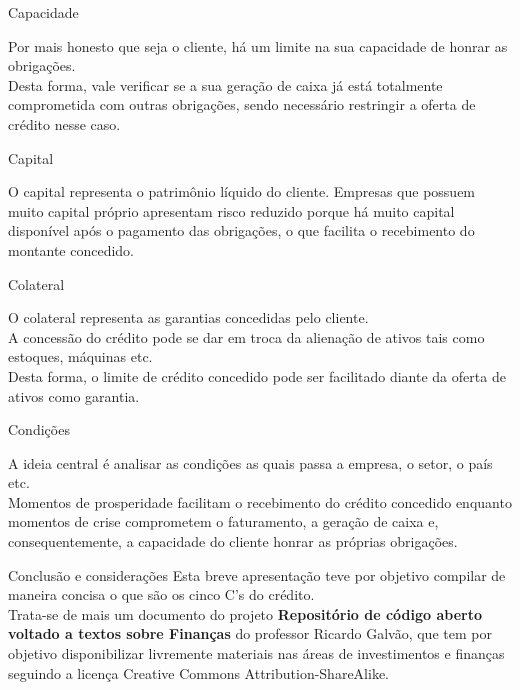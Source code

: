 \documentclass[10pt]{beamer}
\begin{document}
\begin{frame}[fragile]{Capacidade}

Por mais honesto que seja o cliente, há um limite na sua capacidade de honrar as obrigações.\\ Desta forma, vale verificar se a sua geração de caixa já está totalmente comprometida com outras obrigações, sendo necessário restringir a oferta de crédito nesse caso.

\end{frame}


\begin{frame}[fragile]{Capital}

O capital representa o patrimônio líquido do cliente. Empresas que possuem muito capital próprio apresentam risco reduzido porque há muito capital disponível após o pagamento das obrigações, o que facilita o recebimento do montante concedido.

\end{frame}

\begin{frame}[fragile]{Colateral}

O colateral representa as garantias concedidas pelo cliente. \\
A concessão do crédito pode se dar em troca da alienação de ativos tais como estoques, máquinas etc.\\
Desta forma, o limite de crédito concedido pode ser facilitado diante da oferta de ativos como garantia.

\end{frame}

\begin{frame}[fragile]{Condições}

A ideia central é analisar as condições as quais passa a empresa, o setor, o país etc.\\
Momentos de prosperidade facilitam o recebimento do crédito concedido enquanto momentos de crise comprometem o faturamento, a geração de caixa e, consequentemente, a capacidade do cliente honrar as próprias obrigações.

\end{frame}


\begin{frame}[fragile]{Conclusão e considerações}
Esta breve apresentação teve por objetivo compilar de maneira concisa o que são os cinco C's do crédito.\\
Trata-se de mais um documento do projeto \textbf{Repositório de código aberto voltado a textos sobre Finanças} do professor Ricardo Galvão, que tem por objetivo disponibilizar livremente materiais nas áreas de investimentos e finanças seguindo a licença Creative Commons Attribution-ShareAlike.


\end{frame}
\end{document}
